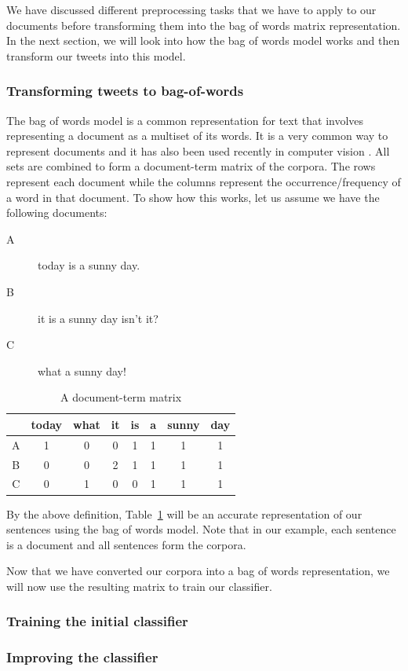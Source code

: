 We have discussed different preprocessing tasks that we have to apply to our documents before
transforming them into the bag of words matrix representation. In the next section, we will look
into how the bag of words model works and then transform our tweets into this model.


\subsubsection{Transforming tweets to bag-of-words}
The bag of words model is a common representation for text that involves representing a document as
a multiset of its words. It is a very common way to represent documents and it has also been used
recently in computer vision \citep{sivic2009efficient}. All sets are combined to form a
document-term matrix of the corpora. The rows represent each document while the columns represent
the occurrence/frequency of a word in that document. To show how this works, let us assume we have
the following documents:
\begin{description}
  \item[A] today is a sunny day.
  \item[B] it is a sunny day isn't it?
  \item[C] what a sunny day!
\end{description}

\begin{table}
  \begin{center}
    \begin{tabular}{|c|c c c c c c c|}
      \hline
      & today & what & it & is & a & sunny & day \\
      \hline
      A & 1 & 0 & 0 & 1 & 1 & 1 & 1 \\
      B & 0 & 0 & 2 & 1 & 1 & 1 & 1 \\
      C & 0 & 1 & 0 & 0 & 1 & 1 & 1 \\
      \hline
    \end{tabular}
    \caption{A document-term matrix}
    \label{table:document-term_matrix}
  \end{center}
\end{table}

By the above definition, Table~\ref{table:document-term_matrix} will be an accurate representation
of our sentences using the bag of words model. Note that in our example, each sentence is a document
and all sentences form the corpora.

Now that we have converted our corpora into a bag of words representation, we will now use the
resulting matrix to train our classifier.
\subsubsection{Training the initial classifier}


\subsubsection{Improving the classifier}

